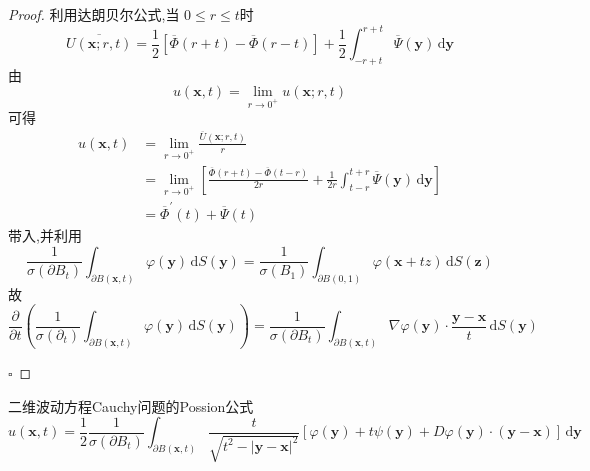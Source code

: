 \documentclass[../../PDE.tex]{subfiles}
\begin{document}
\begin{proof}
    利用达朗贝尔公式,当 \(  0\le r\le t  \)时 \[
    \overline{U\left( \mathbf{x};r,t \right) }= \frac{1 }{2 }\left[ \overline{\Phi }\left( r+ t \right)-\overline{\Phi }\left( r-t \right)   \right]+ \frac{1 }{2 } \int_{-r+ t}^{r+ t}  \overline{\Psi }\left( \mathbf{y} \right)\,\mathrm{d} \mathbf{y}    
    \] 由 \[
    u\left( \mathbf{x},t \right)= \lim_{r\to 0^{+ }}u\left( \mathbf{x};r,t \right)  
    \]可得 \[
    \begin{aligned}
    u\left( \mathbf{x},t \right)&= \lim_{r\to 0^{+ }} \frac{ \overline{U}\left( \mathbf{x};r,t \right)  }{r }\\ 
     & =    \lim_{r\to 0^{+ }}\left[  \frac{ \overline{\Phi }\left( r+ t \right)- \overline{\Phi}\left( t-r \right)   }{2r }+ \frac{1 }{2r } \int_{t-r}^{t+ r}  \overline{\Psi }\left( \mathbf{y} \right)    \,\mathrm{d} \mathbf{y}\right]\\ 
      & =  \overline{\Phi }^{\prime} \left( t \right)+  \overline{\Psi }\left( t \right)   
    \end{aligned}
    \]带入,并利用 \[
    \frac{1}{ \sigma \left(  \partial B_{t}\right) } \int_{ \partial B\left( \mathbf{x},t \right) } \varphi \left( \mathbf{y} \right) \,\mathrm{d} S\left( \mathbf{y} \right)=  \frac{1 }{ \sigma \left( B_{1} \right)  } \int_{ \partial B\left( 0,1 \right) }  \varphi \left( \mathbf{x}+ tz \right)\,\mathrm{d} S\left( \textbf{z} \right)    
    \]故 \[
    \frac{\partial }{\partial t}\left( \frac{1 }{ \sigma \left(  \partial _{t} \right)  } \int_{ \partial B\left( \mathbf{x},t \right) } \varphi \left( \mathbf{y} \right)  \,\mathrm{d} S\left( \mathbf{y} \right) \right)=  \frac{1}{ \sigma \left(  \partial B_{t} \right) } \int_{ \partial B\left( \mathbf{x},t \right) } \nabla  \varphi \left( \mathbf{y} \right)\cdot \frac{\mathbf{y}-\mathbf{x} }{ t}\,\mathrm{d} S\left( \mathbf{y} \right)    
    \]

    \hfill $\square$
\end{proof}


\begin{theorem}{二维波动方程Cauchy问题的Possion公式}
    \[
    u\left( \mathbf{x},t \right)= \frac{1 }{2 } \frac{1}{ \sigma \left(  \partial B_{t} \right) } \int_{ \partial B\left( \mathbf{x},t \right) } \frac{   t }{ \sqrt{t^{2}-\left| \mathbf{y}-\mathbf{x} \right|^{2} }}   \left[ \varphi \left( \mathbf{y} \right)+ t\psi \left( \mathbf{y} \right)+ D \varphi \left( \mathbf{y} \right)\cdot \left( \mathbf{y}-\mathbf{x} \right)  \right]  \,\mathrm{d} \mathbf{y}
    \]
\end{theorem}
\end{document}
